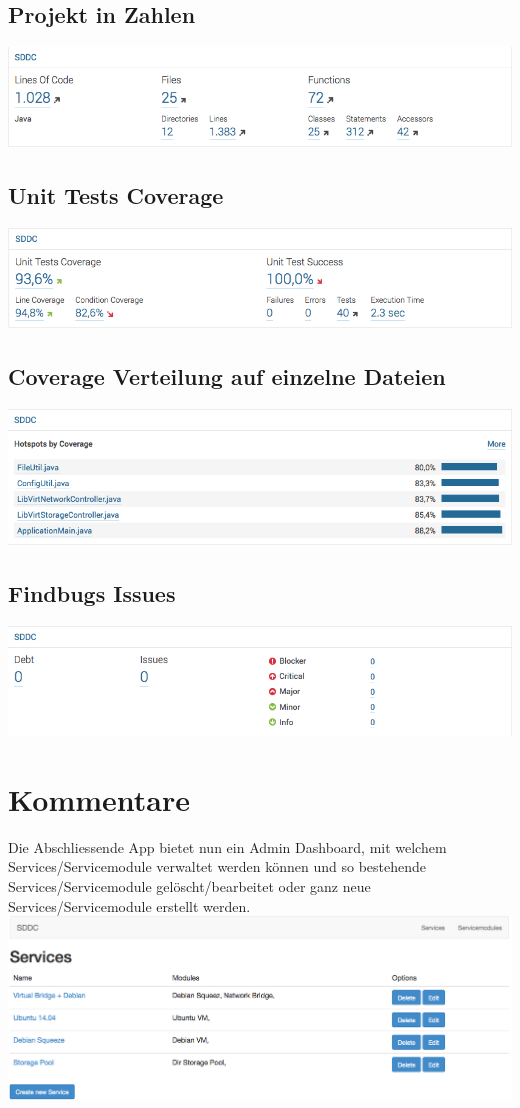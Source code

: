 \documentclass[11pt]{scrartcl}
\begin{document}
\subsection{Projekt in Zahlen}
\includegraphics[width=\textwidth]{loc}

\subsection{Unit Tests Coverage}
\includegraphics[width=\textwidth]{coverage}

\subsection{Coverage Verteilung auf einzelne Dateien}
\includegraphics[width=\textwidth]{coverageperfile}

\subsection{Findbugs Issues}
\includegraphics[width=\textwidth]{issues}

\section{Kommentare}

Die Abschliessende App bietet nun ein Admin Dashboard, mit welchem 
Services/Servicemodule
verwaltet werden können und so bestehende Services/Servicemodule gelöscht/bearbeitet oder ganz 
neue Services/Servicemodule erstellt werden.
\newline
\includegraphics[width=\textwidth]{dashboard}
\end{document}
